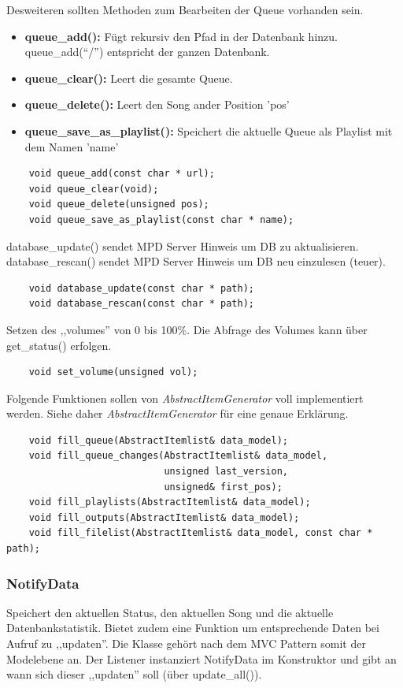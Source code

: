 Desweiteren sollten Methoden zum Bearbeiten der Queue vorhanden sein.
\begin{itemize}
    \item \textbf{queue\_add():} Fügt rekursiv den Pfad in der Datenbank hinzu. queue\_add(``/'') entspricht der ganzen Datenbank.
    \item \textbf{queue\_clear():} Leert die gesamte Queue.
    \item \textbf{queue\_delete():} Leert den Song ander Position 'pos'
    \item \textbf{queue\_save\_as\_playlist():} Speichert die aktuelle Queue als Playlist mit dem Namen 'name'
\end{itemize}
\begin{verbatim}
    void queue_add(const char * url);
    void queue_clear(void);
    void queue_delete(unsigned pos);
    void queue_save_as_playlist(const char * name);
\end{verbatim}

database\_update() sendet MPD Server Hinweis um DB zu aktualisieren.
database\_rescan() sendet MPD Server Hinweis um DB neu einzulesen (teuer).
\begin{verbatim}
    void database_update(const char * path);
    void database_rescan(const char * path);
\end{verbatim}

Setzen des ,,volumes'' von 0 bis 100\%.
Die Abfrage des Volumes kann über get\_status() erfolgen.
\begin{verbatim}
    void set_volume(unsigned vol);
\end{verbatim}

Folgende Funktionen sollen von \emph{AbstractItemGenerator} voll implementiert werden.
Siehe daher \emph{AbstractItemGenerator} für eine genaue Erklärung.
\begin{verbatim}
    void fill_queue(AbstractItemlist& data_model);
    void fill_queue_changes(AbstractItemlist& data_model,
                            unsigned last_version,
                            unsigned& first_pos);
    void fill_playlists(AbstractItemlist& data_model);
    void fill_outputs(AbstractItemlist& data_model);
    void fill_filelist(AbstractItemlist& data_model, const char * path);
\end{verbatim}

\subsubsection{NotifyData}
Speichert den aktuellen Status, den aktuellen Song und die aktuelle Datenbankstatistik.
Bietet zudem eine Funktion um entsprechende Daten bei Aufruf zu ,,updaten''.
Die Klasse gehört nach dem MVC Pattern somit der Modelebene an.
Der Listener instanziert NotifyData im Konstruktor und gibt an wann sich dieser ,,updaten'' soll (über update\_all()).
\\        

